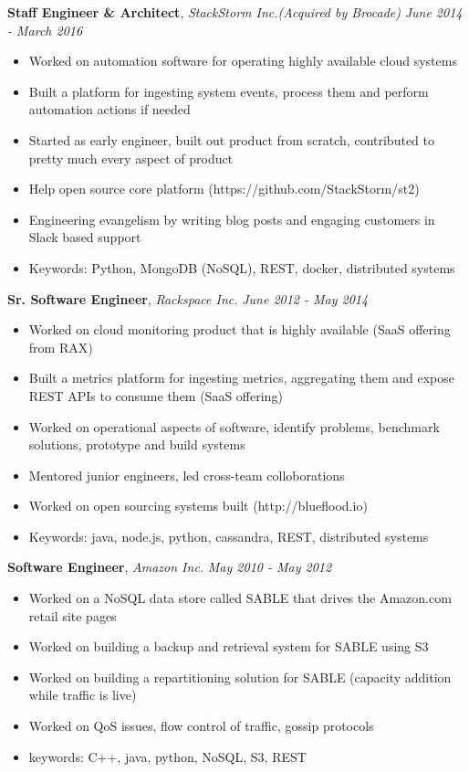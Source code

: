 \documentclass[9pt]{article}
\newenvironment{changemargin}[2]{%
  \begin{list}{}{%
    \setlength{\topsep}{0pt}%
    \setlength{\leftmargin}{#1}%
    \setlength{\rightmargin}{#2}%
    \setlength{\listparindent}{\parindent}%
    \setlength{\itemindent}{\parindent}%
    \setlength{\parsep}{\parskip}%
  }%
  \item[]}{\end{list}
}
\newenvironment{body} {
	\vspace*{-16pt}
	\begin{changemargin}{-0.25in}{-0.5in}
  }
	{\end{changemargin}
}
\begin{document}
\begin{body}
    \textbf{Staff Engineer \& Architect}, \emph{StackStorm Inc.(Acquired by Brocade)} \hfill \emph{June 2014 - March 2016}\\
    \begin{itemize} \itemsep -0pt  %
    \item Worked on automation software for operating highly available cloud systems
    \item Built a platform for ingesting system events, process them and perform
    automation actions if needed
    \item Started as early engineer, built out product from scratch, contributed to pretty much every aspect of product
    \item Help open source core platform (https://github.com/StackStorm/st2)
    \item Engineering evangelism by writing blog posts and engaging customers in Slack based support
    \item Keywords: Python, MongoDB (NoSQL), REST, docker, distributed systems
    \end{itemize}
    
    \textbf{Sr. Software Engineer}, \emph{Rackspace Inc.} \hfill \emph{June 2012 - May 2014}\\ 
    \begin{itemize} \itemsep -0pt  %
    \item Worked on cloud monitoring product that is highly available (SaaS offering from RAX)
    \item Built a metrics platform for ingesting metrics, aggregating them and expose REST APIs to consume them (SaaS offering)
    \item Worked on operational aspects of software, identify problems, benchmark solutions, prototype and build systems
    \item Mentored junior engineers, led cross-team colloborations
    \item Worked on open sourcing systems built (http://blueflood.io)
    \item Keywords: java, node.js, python, cassandra, REST, distributed systems
    \end{itemize}

	\textbf {Software Engineer}, \emph{Amazon Inc.} \hfill \emph{May 2010 - May 2012}\\
	\begin{itemize} \itemsep -0pt
		\item Worked on a NoSQL data store called SABLE that drives the Amazon.com retail site pages
    \item Worked on building a backup and retrieval system for SABLE using S3
    \item Worked on building a repartitioning solution for SABLE (capacity addition while traffic is live)
    \item Worked on QoS issues, flow control of traffic, gossip protocols
    \item keywords: C++, java, python, NoSQL, S3, REST
	\end{itemize}


\end{body}
\end{document}

